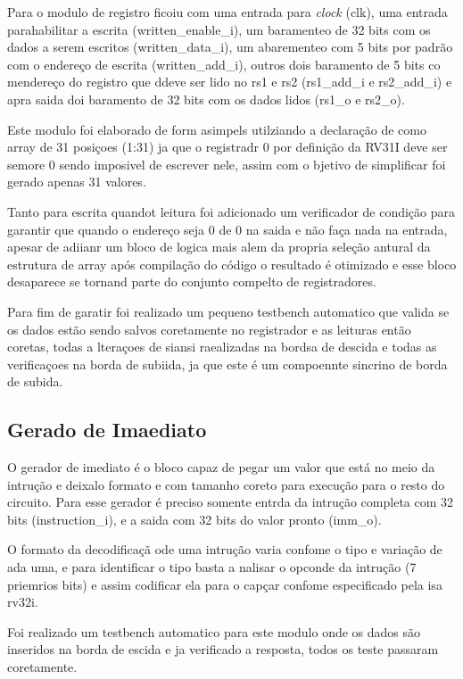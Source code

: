 Para o modulo de registro ficoiu com uma entrada para \textit{clock} (clk), uma entrada parahabilitar a escrita (written_enable_i), um baramenteo de 32 bits com os dados a serem escritos (written_data_i), um abarementeo com 5 bits por padrão com o endereço de escrita (written_add_i), outros dois baramento de 5 bits co mendereço do registro que ddeve ser lido no rs1 e rs2 (rs1_add_i e rs2_add_i) e apra saida doi baramento de 32 bits com os dados lidos (rs1_o e rs2_o).

Este modulo foi elaborado de form asimpels utilziando a declaração de como array de 31 posiçoes (1:31) ja que o registradr 0 por definição da RV31I deve ser semore 0 sendo imposivel de escrever nele, assim com o bjetivo de simplificar foi gerado apenas 31 valores.

Tanto para escrita quandot leitura foi adicionado um verificador de condição para garantir que quando o endereço seja 0 de 0 na saida e não faça nada na entrada, apesar de adiianr um bloco de logica mais alem da propria seleção antural da estrutura de array após compilação do código o resultado é otimizado e esse bloco desaparece se tornand parte do conjunto compelto de registradores.

Para fim de garatir foi realizado um pequeno testbench automatico que valida se os dados estão sendo salvos coretamente no registrador e as leituras então coretas, todas a lteraçoes de siansi raealizadas na bordsa de descida e todas as verificaçoes na borda de subiida, ja que este é um compoennte sincrino de borda de subida. 

\subsection{Gerado de Imaediato}
\label{sub:imm_gen}


O gerador de imediato é o bloco capaz de pegar um valor que está no meio da intrução e deixalo formato e com tamanho coreto para execução para o resto do circuito. Para esse gerador é preciso somente entrda da intrução completa com 32 bits (instruction_i), e a saida com 32 bits do valor pronto (imm_o).

O formato da decodificaçã ode uma intrução varia confome o tipo e variação de ada uma, e para identificar o tipo basta a nalisar o opconde da intrução (7 priemrios bits) e assim codificar ela para o capçar confome especificado pela isa rv32i.

Foi realizado um testbench automatico para este modulo onde os dados são inseridos na borda de escida e ja verificado a resposta, todos os teste passaram coretamente.

